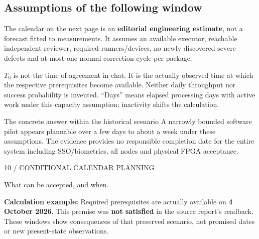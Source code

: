 \begin{cols}
\subsection*{Assumptions of the following window}
The calendar on the next page is an \textbf{editorial engineering estimate}, not a forecast fitted to measurements. It assumes an available executor, reachable independent reviewer, required runners/devices, no newly discovered severe defects and at most one normal correction cycle per package.

$T_0$ is not the time of agreement in chat. It is the actually observed time at which the respective prerequisites become available. Neither daily throughput nor success probability is invented. ``Days'' means elapsed processing days with active work under this capacity assumption; inactivity shifts the calculation.

\begin{boundary}{The concrete answer within the historical scenario}
A narrowly bounded software pilot appears plannable over a few days to about a week under these assumptions. The evidence provides no responsible completion date for the entire system including SSO/biometrics, all nodes and physical FPGA acceptance.
\end{boundary}
\end{cols}
\clearpage{}
{\sffamily\small\color{Accent}10 / CONDITIONAL CALENDAR PLANNING}\par\vspace{4mm}
{\fontsize{24}{29}\selectfont What can be accepted, and when.}\par\vspace{4mm}
\textbf{Calculation example:} Required prerequisites are actually available on \textbf{4 October 2026}. This premise was \textbf{not satisfied} in the source report's readback. These windows show consequences of that preserved scenario, not promised dates or new present-state observations.
\vspace{4mm}
\par
